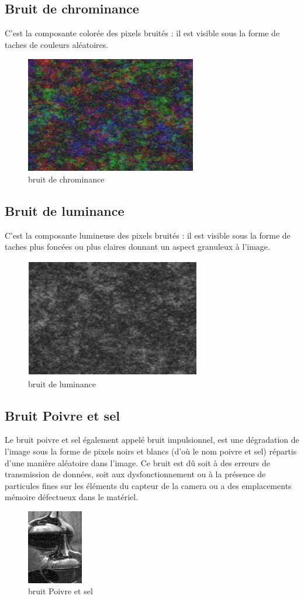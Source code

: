 \documentclass[12pt,a4paper]{report}
\numberwithin{equation}{subsection}
\numberwithin{equation}{section}
\begin{document}
\subsection{Bruit de chrominance}
C’est la composante colorée des pixels bruités : il est visible sous la forme de taches de
couleurs aléatoires.
\begin{figure}[h!]
    \centering
    \includegraphics[width=.3\textwidth]{ch.PNG}
     \caption{bruit de chrominance}
\end{figure}
\subsection{Bruit de luminance}
C’est la composante lumineuse des pixels bruités : il est visible sous la forme de taches
plus foncées ou plus claires donnant un aspect granuleux à l'image.
\begin{figure}[h!]
    \centering
    \includegraphics[width=.3\textwidth]{lu.PNG}
     \caption{bruit de luminance}
\end{figure}
\subsection{Bruit Poivre et sel}
Le bruit poivre et sel également appelé bruit impulsionnel, est une dégradation de l'image sous la forme de pixels noirs et blancs (d’où le nom poivre et sel) répartis d'une manière aléatoire dans l'image. Ce bruit est dû soit à des erreurs de transmission de données, soit aux dysfonctionnement ou à la présence de particules fines sur les éléments du capteur de la camera ou a des emplacements mémoire défectueux dans le matériel.
\begin{figure}[h!]
    \centering
    \includegraphics[height=3.25cm , width=.3\textwidth]{poi.png}
     \caption{bruit Poivre et sel}
\end{figure}
\newpage
\end{document}

